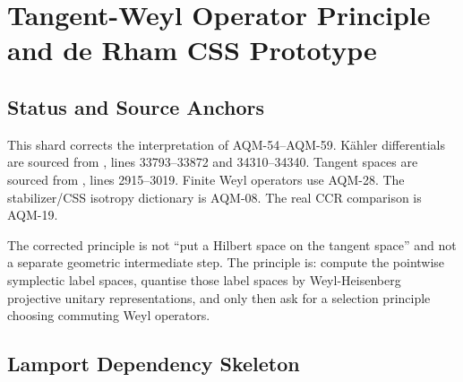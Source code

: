 
\section{Tangent-Weyl Operator Principle and de Rham CSS Prototype}
\label{sec:tangent-weyl-operator-principle}

\subsection{Status and Source Anchors}

\begin{sloppypar}
This shard corrects the interpretation of AQM-54--AQM-59.  K\"ahler
differentials are sourced from
, lines
33793--33872 and 34310--34340.  Tangent spaces are sourced from
, lines
2915--3019.  Finite Weyl operators use AQM-28.  The stabilizer/CSS isotropy
dictionary is AQM-08.  The real CCR comparison is AQM-19.
\end{sloppypar}

The corrected principle is not ``put a Hilbert space on the tangent space'' and
not a separate geometric intermediate step.  The principle is: compute the
pointwise symplectic label spaces, quantise those label spaces by
Weyl-Heisenberg projective unitary representations, and only then ask for a
selection principle choosing commuting Weyl operators.

\subsection{Lamport Dependency Skeleton}

